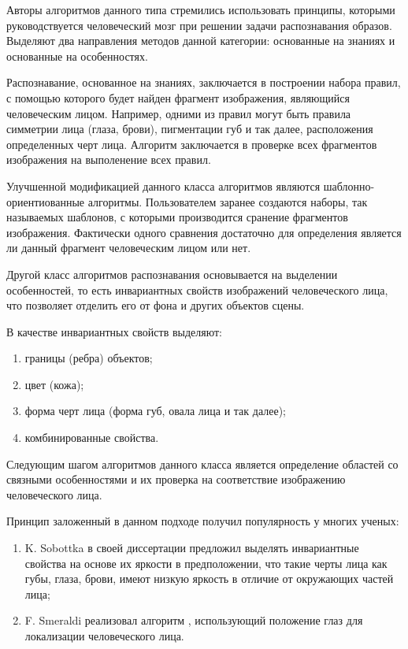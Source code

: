 Авторы алгоритмов данного типа стремились использовать принципы, которыми
руководствуется человеческий мозг при решении задачи распознавания образов.
Выделяют два направления методов данной категории: основанные на знаниях и
основанные на особенностях.

Распознавание, основанное на знаниях, заключается в построении набора правил, с
помощью которого будет найден фрагмент изображения, являющийся
человеческим лицом. Например, одними из правил могут быть правила симметрии
лица (глаза, брови), пигментации губ и так далее, расположения определенных
черт лица. Алгоритм заключается в проверке всех фрагментов изображения на
выполенение всех правил.

Улучшенной модификацией данного класса алгоритмов являются
шаблонно-ориентиованные алгоритмы. Пользователем заранее создаются наборы, так
называемых шаблонов, с которыми производится сранение фрагментов изображения.
Фактически одного сравнения достаточно для определения является ли данный
фрагмент человеческим лицом или нет.

Другой класс алгоритмов распознавания основывается на выделении особенностей,
то есть инвариантных свойств изображений человеческого лица, что позволяет
отделить его от фона и других объектов сцены.

В качестве инвариантных свойств выделяют:
\begin{enumerate}
 \item границы (ребра) объектов;
  \item цвет (кожа);
  \item форма черт лица (форма губ, овала лица и так далее);
  \item комбинированные свойства.
\end{enumerate}

Следующим шагом алгоритмов данного класса является определение областей со
связными особенностями и их проверка на соответствие изображению человеческого
лица. 

Принцип заложенный в данном подходе получил популярность у многих ученых:
\begin{enumerate}
 \item K. Sobottka в своей диссертации \cite{K_Sobottka} предложил выделять
инвариантные свойства на основе их яркости в предположении, что такие черты
лица как губы, глаза, брови, имеют низкую яркость в отличие от окружающих
частей лица;
  \item F. Smeraldi реализовал алгоритм \cite{F_Smeraldi}, использующий
положение глаз для локализации человеческого лица. 
\end{enumerate}


